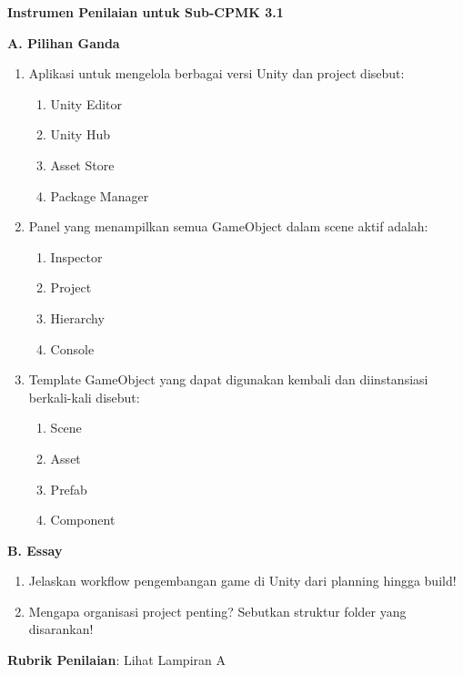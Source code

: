 \documentclass[../main]{subfiles}
\begin{document}

\begin{asesmen}
\textbf{Instrumen Penilaian untuk Sub-CPMK 3.1}

\textbf{A. Pilihan Ganda}

\begin{enumerate}
  \item Aplikasi untuk mengelola berbagai versi Unity dan project disebut:
  \begin{enumerate}
    \item Unity Editor
    \item Unity Hub
    \item Asset Store
    \item Package Manager
  \end{enumerate}
  
  \item Panel yang menampilkan semua GameObject dalam scene aktif adalah:
  \begin{enumerate}
    \item Inspector
    \item Project
    \item Hierarchy
    \item Console
  \end{enumerate}
  
  \item Template GameObject yang dapat digunakan kembali dan diinstansiasi berkali-kali disebut:
  \begin{enumerate}
    \item Scene
    \item Asset
    \item Prefab
    \item Component
  \end{enumerate}
\end{enumerate}

\textbf{B. Essay}

\begin{enumerate}
  \item Jelaskan workflow pengembangan game di Unity dari planning hingga build!
  \item Mengapa organisasi project penting? Sebutkan struktur folder yang disarankan!
\end{enumerate}

\textbf{Rubrik Penilaian}: Lihat Lampiran A
\end{asesmen}
\end{document}
